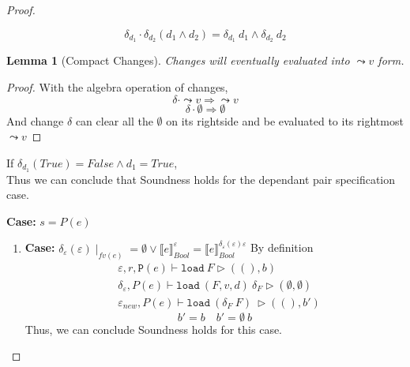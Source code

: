 \documentclass[10pt,twoside,a4paper]{article}
\theoremstyle{theorem}
\theoremstyle{lemma}
\newtheorem{lemma}{Lemma}[section]
\theoremstyle{property}
\theoremstyle{definition}
\theoremstyle{assumption}
\begin{document}
\begin{proof}
\begin{enumerate}
\begin{displaymath}
		\delta_{d_1} \cdot \delta_{d_2} (d_1 \land d_2) = \delta_{d_1} ~d_1 \land \delta_{d_2} ~d_2
	\end{displaymath}
	\begin{lemma}[Compact Changes]
	Changes will eventually evaluated into $\leadsto v$ form.
	\end{lemma}
	\begin{proof}
	With the algebra operation of changes, 
	\begin{displaymath}
		\delta \cdot \leadsto v \Rightarrow \leadsto v
	\end{displaymath}
	\begin{displaymath}
		\delta \cdot \emptyset \Rightarrow \emptyset
	\end{displaymath}
	And change $\delta$ can clear all the $\emptyset$ on its rightside and be evaluated to its rightmost $\leadsto v$
	\end{proof}
	If $\delta_{d_1} (True) = False \land d_1 = True$,
	\\
	Thus we can conclude that Soundness holds for the dependant pair specification case.
	\end{enumerate}

	\textbf{Case: } $s = P(e)$\\
	\begin{enumerate}
	\item
	\textbf{Case: } $\delta_\varepsilon(\varepsilon) \mid_{fv(e)} = \emptyset \lor \llbracket e \rrbracket^{\varepsilon}_{Bool} = \llbracket e \rrbracket^{\delta_\varepsilon(\varepsilon) \varepsilon}_{Bool}$
	By definition
	\begin{align*}
		& \varepsilon, r, \mathtt{P}(e) \vdash \mathtt{load}~F \rhd ((),b)\\
		& \delta_\varepsilon, P(e) \vdash \mathtt{load}~ (F,v,d)~ \delta_F \rhd (\emptyset, \emptyset)\\
		& \varepsilon_{new}, P(e) \vdash \mathtt{load}~ (\delta_F~F)~ \rhd ((),b')
	\end{align*}
	\begin{displaymath}
		b' = b \quad b' = \emptyset ~b
	\end{displaymath}
	Thus, we can conclude Soundness holds for this case.


\end{enumerate}
\end{proof}
\end{document}

